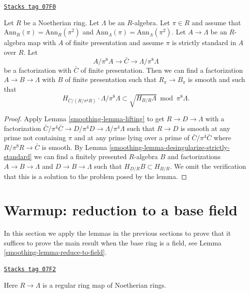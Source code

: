 \begin{lemma}
\label{smoothing-lemma-desingularize-lifting-apply}
\href{https://stacks.math.columbia.edu/tag/07F0}{\texttt{Stacks tag 07F0}}

Let $R$ be a Noetherian ring. Let $\Lambda$ be an $R$-algebra.
Let $\pi \in R$ and assume that $\text{Ann}_R(\pi) = \text{Ann}_R(\pi^2)$ and
$\text{Ann}_\Lambda(\pi) = \text{Ann}_\Lambda(\pi^2)$.
Let $A \to \Lambda$ be an $R$-algebra map with
$A$ of finite presentation and assume $\pi$ is strictly standard
in $A$ over $R$. Let
$$
A/\pi^8A \to \bar C \to \Lambda/\pi^8\Lambda
$$
be a factorization with $\bar C$ of finite presentation.
Then we can find a factorization $A \to B \to \Lambda$ with $B$ of finite
presentation such that $R_\pi \to B_\pi$ is smooth and such that
$$
H_{\bar C/(R/\pi^8 R)} \cdot \Lambda/\pi^8\Lambda
\subset
\sqrt{H_{B/R} \Lambda} \bmod \pi^8\Lambda.
$$
\end{lemma}

\begin{proof}

Apply Lemma \ref{smoothing-lemma-lifting} to get $R \to D \to \Lambda$
with a factorization
$\bar C/\pi^4\bar C \to D/\pi^4 D \to \Lambda/\pi^4\Lambda$
such that $R \to D$ is smooth at any prime not containing $\pi$
and at any prime lying over a prime of $\bar C/\pi^4\bar C$
where $R/\pi^8 R \to \bar C$ is smooth.
By Lemma \ref{smoothing-lemma-desingularize-strictly-standard}
we can find a finitely presented $R$-algebra $B$ and
factorizations $A \to B \to \Lambda$ and $D \to B \to \Lambda$
such that $H_{D/R}B \subset H_{B/R}$. We omit the verification that
this is a solution to the problem posed by the lemma.
\end{proof}

\section{Warmup: reduction to a base field}
\label{smoothing-section-reduction}
In this section we apply the lemmas in the previous sections
to prove that it suffices to prove the main result when the base
ring is a field, see Lemma \ref{smoothing-lemma-reduce-to-field}.

\begin{definition}
\label{smoothing-situation-global}
\href{https://stacks.math.columbia.edu/tag/07F2}{\texttt{Stacks tag 07F2}}

Here $R \to \Lambda$ is a regular ring map of Noetherian rings.
\end{definition}

